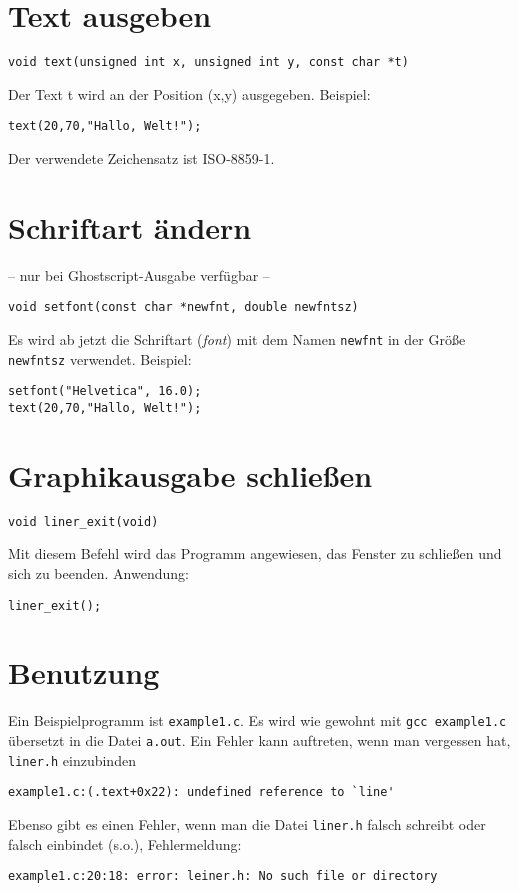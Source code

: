 \documentclass{article}
\begin{document}
\section{Text ausgeben}
\begin{verbatim}
void text(unsigned int x, unsigned int y, const char *t)
\end{verbatim}
Der Text t wird an der Position (x,y) ausgegeben. Beispiel:
\begin{verbatim}
text(20,70,"Hallo, Welt!");
\end{verbatim}
Der verwendete Zeichensatz ist ISO-8859-1.
\section{Schriftart \"andern}
-- nur bei Ghostscript-Ausgabe verf\"ugbar --
\begin{verbatim}
void setfont(const char *newfnt, double newfntsz)
\end{verbatim}
Es wird ab jetzt die Schriftart (\emph{font}) 
mit dem Namen \verb_newfnt_ in der Gr\"o\ss{}e
\verb_newfntsz_ verwendet. Beispiel:
\begin{verbatim}
setfont("Helvetica", 16.0);
text(20,70,"Hallo, Welt!");
\end{verbatim}
\section{Graphikausgabe schlie\ss{}en}
\begin{verbatim}
void liner_exit(void)
\end{verbatim}
Mit diesem Befehl wird das Programm angewiesen, das Fenster
zu schlie\ss{}en und sich zu beenden. Anwendung:
\begin{verbatim}
liner_exit();
\end{verbatim}
\section{Benutzung}
Ein Beispielprogramm ist \verb_example1.c_. Es wird wie gewohnt mit
\verb_gcc example1.c_ \"ubersetzt in die Datei \verb_a.out_.
Ein Fehler kann auftreten, wenn man vergessen hat, \verb_liner.h_ einzubinden
\begin{verbatim}
example1.c:(.text+0x22): undefined reference to `line'
\end{verbatim}
Ebenso gibt es einen Fehler, wenn man die Datei
\verb_liner.h_ falsch schreibt oder falsch einbindet (s.o.), Fehlermeldung:
\begin{verbatim}
example1.c:20:18: error: leiner.h: No such file or directory
\end{verbatim}
\end{document}
